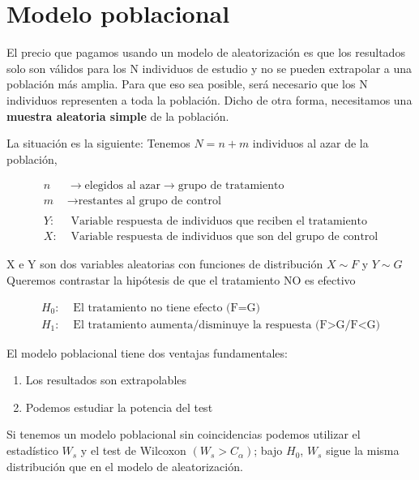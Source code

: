 \section{Modelo poblacional}

El precio que pagamos usando un modelo de aleatorización es que los resultados solo son válidos para los N individuos de estudio y no se pueden extrapolar a una población más amplia.
Para que eso sea posible, será necesario que los N individuos representen a toda la población. Dicho de otra forma, necesitamos una \textbf{muestra aleatoria simple} de la población.

La situación es la siguiente:
Tenemos $N=n+m$ individuos al azar de la población,

$$
\begin{aligned}
    n & \longrightarrow \text{elegidos al azar}\longrightarrow \text{grupo de tratamiento} \\
    m & \longrightarrow \text{restantes al grupo de control} \\
    \ & \ \\
    Y: & \text{ Variable respuesta de individuos que reciben el tratamiento}\\
    X: & \text{ Variable respuesta de individuos que son del grupo de control}  
\end{aligned}
$$

X e Y son dos variables aleatorias con funciones de distribución $X\sim F$ y $Y\sim G$ \\
\noindent Queremos contrastar la hipótesis de que el tratamiento NO es efectivo

$$
\begin{aligned}
    H_0: & \text{ El tratamiento no tiene efecto (F=G)} \\
    H_1: & \text{ El tratamiento aumenta/disminuye la respuesta (F>G/F<G)}  
\end{aligned}
$$

El modelo poblacional tiene dos ventajas fundamentales:
\begin{enumerate}
    \item Los resultados son extrapolables
    \item Podemos estudiar la potencia del test
\end{enumerate}

\noindent Si tenemos un modelo poblacional sin coincidencias podemos utilizar el estadístico $W_s$ y el test de Wilcoxon $(W_s>C_\alpha)$; bajo $H_0$, $W_s$ sigue la misma distribución que en el modelo de aleatorización.

